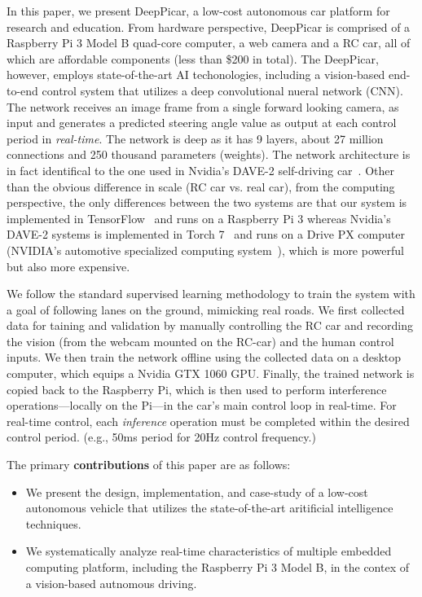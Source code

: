 \documentclass[10pt, conference]{IEEEtran}
\begin{document}
In this paper, we present DeepPicar, a low-cost autonomous car
platform for research and education. From hardware perspective, 
DeepPicar is comprised of a Raspberry Pi 3 Model B quad-core
computer, a web camera and a RC car, all of which are affordable
components (less than \$200 in total).
The DeepPicar, however, employs state-of-the-art AI
techonologies, including a vision-based end-to-end control system that
utilizes a deep convolutional nueral network (CNN).
The network receives an image frame from a single forward
looking camera, as input and generates a predicted steering angle
value as output at each control period in \emph{real-time}. 
The network is deep as it has 9 layers, about 27 million connections
and 250 thousand parameters (weights).
The network architecture is in fact identifical to the one
used in Nvidia's DAVE-2 self-driving car~\cite{Bojarski2016}. Other
than the obvious difference in scale (RC car vs. real car), from the
computing perspective, the only differences between
the two systems are that our system is implemented in
TensorFlow~\cite{abadi2016tensorflow} and runs on a 
Raspberry Pi 3 whereas Nvidia's DAVE-2 systems is implemented in Torch
7~\cite{collobert2011torch7} and runs on a Drive PX computer (NVIDIA's
automotive specialized computing system~\cite{drivepx}), which is more
powerful but also more expensive.

We follow the standard supervised learning methodology to train the
system with a goal of following lanes on the ground, mimicking real
roads. We first collected data for taining and validation by manually 
controlling the RC car and recording the vision (from the webcam
mounted on the RC-car) and the human control inputs. We then train the
network offline using the collected data on a desktop computer, which
equips a Nvidia GTX 1060 GPU. Finally, the trained network is copied
back to the Raspberry Pi, which is then used to perform interference
operations---locally on the Pi---in the car's main control loop in
real-time. For real-time control, each \emph{inference} operation must
be completed within the desired control period. (e.g., 50ms period for
20Hz control frequency.)

The primary {\bf contributions} of this paper are as follows:
\begin{itemize}
  \item We present the design, implementation, and case-study of a low-cost
    autonomous vehicle that utilizes the state-of-the-art aritificial 
    intelligence techniques.
  \item We systematically analyze real-time characteristics of
    multiple embedded computing platform, including the Raspberry Pi 3
    Model B, in the contex of a vision-based autnomous driving.
\end{itemize}
\end{document}
